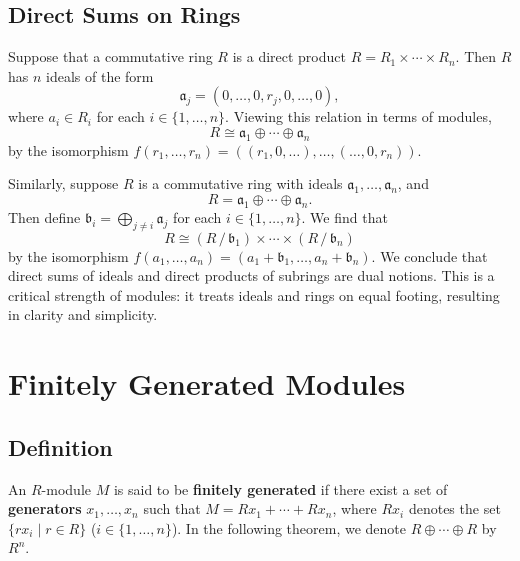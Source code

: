 \documentclass[11pt]{article}
\begin{document}
\newpage

\subsection{Direct Sums on Rings}

Suppose that a commutative ring $R$ is a direct product $R = R_{1} \times \cdots \times R_{n}$. Then $R$ has $n$ ideals of the form
\[
	\mathfrak{a}_{j} = (0, \ldots, 0, r_{j}, 0, \ldots, 0),
\]
where $a_{i} \in R_{i}$ for each $i \in \{ 1, \ldots, n \}$. Viewing this relation in terms of modules,
\[
	R \cong \mathfrak{a}_{1} \oplus \cdots \oplus \mathfrak{a}_{n}
\]
by the isomorphism $f(r_{1}, \ldots, r_{n}) = ((r_{1}, 0, \ldots), \ldots, (\ldots, 0, r_{n}))$.

Similarly, suppose $R$ is a commutative ring with ideals $\mathfrak{a}_{1}, \ldots, \mathfrak{a}_{n}$, and
\[
	R = \mathfrak{a}_{1} \oplus \cdots \oplus \mathfrak{a}_{n}.
\]
Then define $\mathfrak{b}_{i} = \bigoplus_{j \ne i} \mathfrak{a}_{j}$ for each $i \in \{ 1, \ldots, n \}$. We find that
\[
	R \cong (R \,/\, \mathfrak{b}_{1}) \times \cdots \times (R \,/\, \mathfrak{b}_{n})
\]
by the isomorphism $f(a_{1}, \ldots, a_{n}) = (a_{1} + \mathfrak{b}_{1}, \ldots, a_{n} + \mathfrak{b}_{n})$. We conclude that direct sums of ideals and direct products of subrings are dual notions. This is a critical strength of modules: it treats ideals and rings on equal footing, resulting in clarity and simplicity.


\section{Finitely Generated Modules}


\subsection{Definition}

An $R$-module $M$ is said to be \textbf{finitely generated} if there exist a set of \textbf{generators} $x_{1}, \ldots, x_{n}$ such that $M = Rx_{1} + \cdots + Rx_{n}$, where $Rx_{i}$ denotes the set $\{ rx_{i} \mid r \in R \}$ ($i \in \{ 1, \ldots, n \}$). In the following theorem, we denote $R \oplus \cdots \oplus R$ by $R^{n}$.
\end{document}
